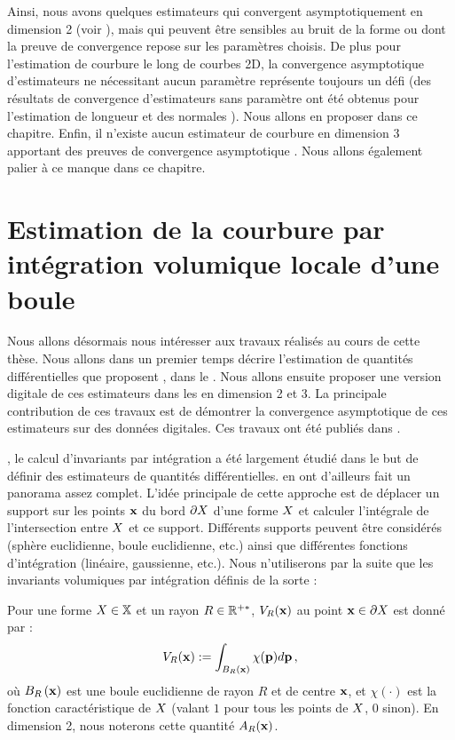 Ainsi, nous avons quelques estimateurs qui convergent asymptotiquement en
dimension 2 (voir ), mais qui peuvent être sensibles au
bruit de la forme ou dont la preuve de convergence repose sur les paramètres
choisis. De plus pour l'estimation de courbure le long de courbes 2D, la
convergence asymptotique d'estimateurs ne nécessitant aucun paramètre représente
toujours un défi (des résultats de convergence d'estimateurs sans paramètre ont
été obtenus pour l'estimation de longueur \cite{Coeurjolly2004} et des normales
\cite{deVieilleville2007}). Nous allons en proposer dans ce chapitre. Enfin, il
n'existe aucun estimateur de courbure en dimension 3 apportant des preuves de
convergence asymptotique \cite{Lenoir1997,Fourey2008}. Nous allons également
palier à ce manque dans ce chapitre.

\section{Estimation de la courbure par intégration volumique locale d'une boule}
\label{sec:estimators:volume}
%
Nous allons désormais nous intéresser aux travaux réalisés au cours de cette
thèse. Nous allons dans un premier temps décrire l'estimation de quantités
différentielles que proposent ,
dans le . Nous allons ensuite proposer une
version digitale de ces estimateurs dans les 
en dimension 2 et 3. La principale contribution de ces travaux est de démontrer
la convergence asymptotique de ces estimateurs sur des données digitales. Ces
travaux ont été publiés dans \cite{DGCI2013,CVIU2014}.

\GeometryProcessing, le calcul d'invariants par intégration a été largement
étudié dans le but de définir des estimateurs de quantités différentielles.
 en ont d'ailleurs fait un
panorama assez complet. L'idée principale de cette approche est de déplacer un support
sur les points $\mathbf{x}$ du bord $\partial X$ d'une forme $X$ et calculer
l'intégrale de l'intersection entre $X$ et ce support. Différents supports
peuvent être considérés (sphère euclidienne, boule euclidienne, etc.) ainsi que
différentes fonctions d'intégration (linéaire, gaussienne, etc.). Nous
n'utiliserons par la suite que les invariants volumiques par intégration définis
de la sorte :
%
\begin{definition}
  \label{def:Volume}
  Pour une forme $X \in \mathbb{X}$ et un rayon $R \in \mathbb{R}^{+*}$,  $V_R(\mathbf{x})$ au point $\mathbf{x} \in \partial X$ est donné par :
  \begin{equation}
    V_R(\mathbf{x}) := \int_{B_{R}\left(\mathbf{x}\right)} \chi(\mathbf{p})d\mathbf{p}\,,
  \end{equation}
  où $B_{R}\left(\mathbf{x}\right)$ est une boule euclidienne de rayon $R$ et de centre $\mathbf{x}$,
  et $\chi(\cdot)$ est la fonction caractéristique de $X$ (valant $1$ pour
  tous les points de $X$, $0$ sinon). En dimension 2, nous noterons cette
  quantité $A_R(\mathbf{x})$.
\end{definition}
%
